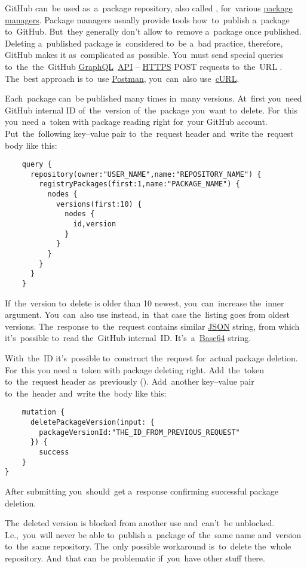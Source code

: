 \label{githubdeletepackage}
GitHub can~be used as~a~package repository, also called , for~various \hyperref[packagemanager]{package managers}.
Package managers usually provide tools how~to~publish a~package to~GitHub.
But~they generally don't allow to~remove a~package once published.
Deleting a~published package is~considered to~be a~bad practice, therefore, GitHub makes it as~complicated as~possible.
You~must send special queries to~the~the~GitHub \hyperref[graphql]{GraphQL}~\hyperref[api]{API} -- \hyperref[https]{HTTPS} POST requests to~the~URL .
The~best approach is to~use \href{https://www.getpostman.com/}{Postman}, you~can~also use~\hyperref[curl]{cURL}.

Each~package can~be published many times in~many versions.
At~first you~need GitHub internal ID of~the~version of~the~package you~want to~delete.
For~this you~need a~token with package reading right for~your GitHub account.
Put~the~following key--value pair  to~the~request header and~write the~request body like this:
\begin{lstlisting}
    query {
      repository(owner:"USER_NAME",name:"REPOSITORY_NAME") {
        registryPackages(first:1,name:"PACKAGE_NAME") {
          nodes {
            versions(first:10) {
              nodes {
                id,version
              }
            }
          }
        }
      }
    }
\end{lstlisting}

\noindent If~the~version to~delete is older than 10 newest, you~can~increase the~inner  argument.
You~can~also use  instead, in~that case the~listing goes from oldest versions.
The~response to~the~request contains similar \hyperref[json]{JSON} string, from which it's~possible to~read the~GitHub internal~ID\@.
It's~a~\hyperref[base64]{Base64} string.

With~the~ID it's~possible to~construct the~request for~actual package deletion.
For~this you need a~token with package deleting right.
Add~the~token to~the~request header as~previously ().
Add~another key--value pair  to~the~header and~write the~body like this:
\begin{lstlisting}
    mutation {
      deletePackageVersion(input: {
        packageVersionId:"THE_ID_FROM_PREVIOUS_REQUEST"
      }) {
        success
    }
}
\end{lstlisting}

\noindent After submitting you~should~get a~response confirming successful package deletion.

\warning The~deleted version is blocked from another use and~can't~be unblocked.
I.e.,~you~will never be able to~publish a~package of~the~same name and~version to~the~same repository.
The~only possible workaround is~to~delete the~whole repository.
And~that can~be problematic if~you~have other stuff there.
